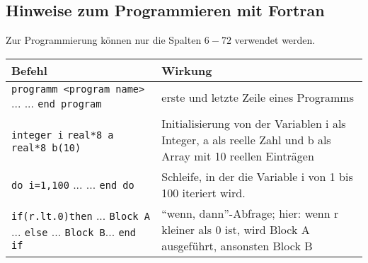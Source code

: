 \clearpage
\subsection*{Hinweise zum Programmieren mit Fortran}

Zur Programmierung k\"onnen nur die Spalten $6-72$ verwendet werden.\\

\begin{tabular}{p{60mm}p{70mm}}
%
\textbf{Befehl}                               & \textbf{Wirkung} \\
%
\midrule
\verb|programm <program name>|\newline
...\newline
...\newline
\verb|end program|                            & erste und letzte Zeile eines Programms\\
%
\midrule
\verb|integer i|\newline
\verb|real*8 a|\newline
\verb|real*8 b(10)|                           & Initialisierung von der Variablen i als Integer, a als reelle Zahl und b als Array mit 10 reellen Einträgen \\
%
\midrule
\verb|do i=1,100|\newline
...\newline
...\newline
\verb|end do|                                 & Schleife, in der die Variable i von 1 bis 100 iteriert wird.\\
%
\midrule
\verb|if(r.lt.0)then|\newline
... \verb|Block A| ...\newline
\verb|else|\newline
... \verb|Block B|...\newline
\verb|end if|                                & \enquote{wenn, dann}-Abfrage; hier: wenn r kleiner als 0 ist, wird Block A ausgeführt, ansonsten Block B \\
 \midrule
\end{tabular}



